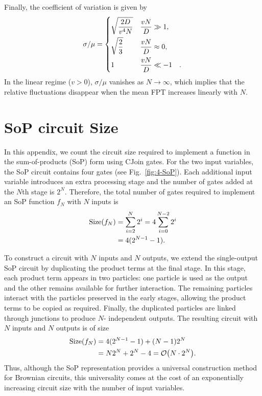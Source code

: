 \documentclass[%
 reprint,
superscriptaddress,
 amsmath,amssymb,
 aps,
 prx,
]{revtex4-2}
\begin{document}
Finally, the coefficient of variation is given by 
\begin{align}
    \sigma / \mu = 
    \begin{dcases}
        \sqrt{\frac{2D}{v^4N}}& \frac{vN}{D} \gg 1, \\
        \sqrt{\frac{2}{3}} & \frac{vN}{D} \approx 0, \\
        1 & \frac{vN}{D} \ll - 1 \quad.
    \end{dcases}
\end{align}
In the linear regime ($v>0$), $\sigma/\mu$ vanishes as $N\to\infty$, which implies that the relative fluctuations disappear when the mean FPT increases linearly with $N$.  

\section{SoP circuit Size}\label{appendix:SoP circuit size}
In this appendix, we count the circuit size required to implement a function in the sum-of-products (SoP) form using CJoin gates. For the two input variables, the SoP circuit contains four gates (see Fig.~\ref{fig:4-SoP}). Each additional input variable introduces an extra processing stage and the number of gates added at the $N$th stage is $2^N$. Therefore, the total number of gates required to implement an SoP function $f_N$ with $N$ inputs is  
\begin{align}
    \text{Size}(f_N) &= \sum_{i=2}^N 2^i = 4 \sum_{i=0}^{N-2} 2^i \notag \\
    &= 4(2^{N-1}-1). 
\end{align}

To construct a circuit with $N$ inputs and $N$ outputs, we extend the single-output SoP circuit by duplicating the product terms at the final stage. In this stage, each product term appears in two particles: one particle is used as the output and the other remains available for further interaction. The remaining particles interact with the particles preserved in the early stages, allowing the product terms to be copied as required. Finally, the duplicated particles are linked through junctions to produce $N$- independent outputs. The resulting circuit with $N$ inputs and $N$ outputs is of size
\begin{align}
    \text{Size}(f_N) &= 4(2^{N-1}-1) + (N-1) 2^N \notag \\
    & = N 2^N + 2^N - 4 = \order{N \cdot 2^N}.
\end{align}
Thus, although the SoP representation provides a universal construction method for Brownian circuits, this universality comes at the cost of an exponentially increasing circuit size with the number of input variables. 
\end{document}
